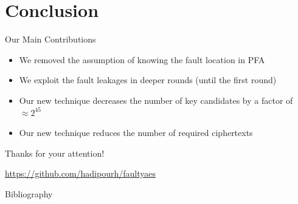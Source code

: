 \documentclass[table,aspectratio=169]{beamer}
\begin{document}
\section{Conclusion}

\begin{frame}{Our Main Contributions}
\begin{itemize}
\item[\faCheckCircleO] We removed the assumption of knowing the fault location in PFA
\item[\faCheckCircleO] We exploit the fault leakages in deeper rounds (until the first round)
\item[\faCheckCircleO] Our new technique decreases the number of key candidates by a factor of $\approx 2^{45}$
\item[\faCheckCircleO] Our new technique reduces the number of required ciphertexts
\end{itemize}

\begin{center}
\vspace{0.44cm}

{\large Thanks for your attention!}

\vspace{0.35cm}
\url{https://github.com/hadipourh/faultyaes}
\end{center}
\end{frame}


\begin{frame}[allowframebreaks]{Bibliography}
  \printbibliography
\end{frame}
\end{document}
